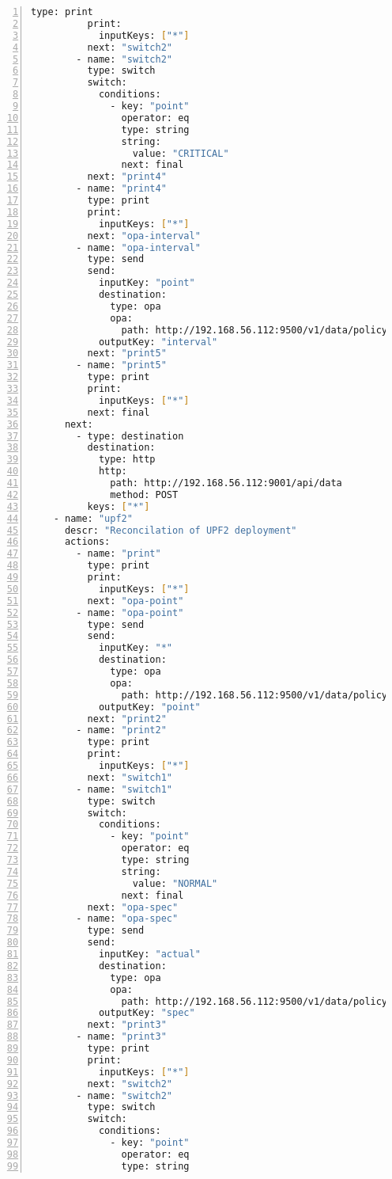 \begin{lstlisting}[language=sh, caption={\emph{Kod LupN}}, label={lst:a101}, numbers=left, stepnumber=1]
          type: print
          print:
            inputKeys: ["*"]
          next: "switch2"
        - name: "switch2"
          type: switch
          switch:
            conditions:
              - key: "point"
                operator: eq
                type: string
                string: 
                  value: "CRITICAL"
                next: final
          next: "print4"
        - name: "print4"
          type: print
          print:
            inputKeys: ["*"]
          next: "opa-interval"
        - name: "opa-interval"
          type: send
          send: 
            inputKey: "point"
            destination: 
              type: opa
              opa: 
                path: http://192.168.56.112:9500/v1/data/policy/interval
            outputKey: "interval"
          next: "print5"
        - name: "print5"
          type: print
          print:
            inputKeys: ["*"]
          next: final
      next: 
        - type: destination
          destination: 
            type: http
            http: 
              path: http://192.168.56.112:9001/api/data
              method: POST
          keys: ["*"]
    - name: "upf2"
      descr: "Reconcilation of UPF2 deployment"
      actions:
        - name: "print"
          type: print
          print:
            inputKeys: ["*"]
          next: "opa-point"
        - name: "opa-point"
          type: send
          send: 
            inputKey: "*"
            destination: 
              type: opa
              opa: 
                path: http://192.168.56.112:9500/v1/data/policy/point
            outputKey: "point"
          next: "print2"
        - name: "print2"
          type: print
          print:
            inputKeys: ["*"]
          next: "switch1"
        - name: "switch1"
          type: switch
          switch:
            conditions:
              - key: "point"
                operator: eq
                type: string
                string: 
                  value: "NORMAL"
                next: final
          next: "opa-spec"
        - name: "opa-spec"
          type: send
          send: 
            inputKey: "actual"
            destination: 
              type: opa
              opa: 
                path: http://192.168.56.112:9500/v1/data/policy/spec
            outputKey: "spec"
          next: "print3"
        - name: "print3"
          type: print
          print:
            inputKeys: ["*"]
          next: "switch2"
        - name: "switch2"
          type: switch
          switch:
            conditions:
              - key: "point"
                operator: eq
                type: string

\end{lstlisting}
